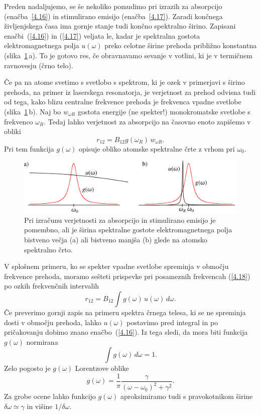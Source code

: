 Preden nadaljujemo, se še nekoliko pomudimo pri izrazih za absorpcijo
(enačba~\ref{4.16}) in stimulirano emisijo (enačba~\ref{4.17}).
Zaradi končnega življenjskega časa ima gornje
stanje tudi končno spektralno širino. Zapisani enačbi~(\ref{4.16}) in (\ref{4.17})
veljata le, kadar je spektralna gostota elektromagnetnega polja $u(\omega)$
preko celotne širine prehoda približno konstantna (slika~\ref{fig:spektri}\,a). To je gotovo res, če
obravnavamo sevanje v votlini, ki je v termičnem ravnovesju (črno telo). 


Če pa na atome svetimo s svetlobo s spektrom, ki je ozek v primerjavi s širino prehoda, na
primer iz laserskega resonatorja, je verjetnost za prehod odvisna tudi od tega, kako
blizu centralne frekvence prehoda je frekvenca vpadne svetlobe (slika~\ref{fig:spektri}\,b). 
Naj bo $w_{\omega R}$ gostota energije (ne spekter!) monokromatske svetlobe s frekvenco
$\omega_R$. Tedaj lahko verjetnost za absorpcijo na časovno enoto zapišemo
v obliki 
\begin{equation}
r_{12}=B_{12}g(\omega_R)\, w_{\omega R}.
\label{4.18}
\end{equation}
Pri tem funkcija $g(\omega)$ opisuje obliko atomske spektralne črte z vrhom 
pri $\omega_{0}$. \\
\begin{figure}[h]
\centering
\includegraphics[width=12truecm]{slike/05_Spektri.png}
\caption{Pri izračunu verjetnosti za absorpcijo in stimulirano emisijo je pomembno, ali je 
širina spektralne gostote elektromagnetnega polja bistveno večja (a) ali bistveno manjša (b)
glede na atomsko spektralno črto.}
\label{fig:spektri}
\end{figure}

V splošnem primeru, ko se spekter vpadne svetlobe spreminja v območju 
frekvence prehoda, moramo sešteti prispevke pri posameznih frekvencah (\ref{4.18}) 
po ozkih frekvenčnih intervalih
\begin{equation}
r_{12}=B_{12}\int g(\omega)\, u(\omega)\, d\omega.
\label{4.19}
\end{equation}
Če preverimo gornji zapis na primeru spektra črnega telesa, ki se ne spreminja 
dosti v območju prehoda, lahko $u(\omega)$ postavimo pred integral in po pričakovanju
dobimo znano enačbo~(\ref{4.16}). Iz tega sledi, da mora biti funkcija $g(\omega)$ normirana
\begin{equation}
\int g(\omega)\, d\omega=1.
\label{4.20}
\end{equation}
Zelo pogosto je $g(\omega)$ Lorentzove oblike
\begin{equation}
g(\omega)=\frac{1}{\pi}\frac{\gamma}{(\omega-\omega_{0})^{2}+\gamma^{2}}.
\label{4.21}
\end{equation}
Za grobe ocene lahko funkcijo $g(\omega)$ aproksimiramo tudi s pravokotnikom širine
$\delta\omega\simeq\gamma$ in višine $1/\delta\omega$.

